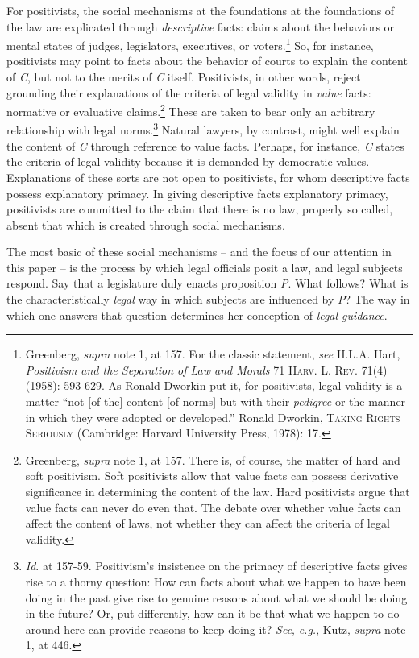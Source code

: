 For positivists, the social mechanisms at the foundations at the
foundations of the law are explicated through \emph{descriptive} facts:
claims about the behaviors or mental states of judges, legislators,
executives, or voters.\footnote{Greenberg, \emph{supra} note 1, at 157.
  For the classic statement, \emph{see} H.L.A. Hart, \emph{Positivism
  and the Separation of Law and Morals} 71 \textsc{Harv. L. Rev.}
  71(4)(1958): 593-629. As Ronald Dworkin put it, for positivists, legal
  validity is a matter ``not {[}of the{]} content {[}of norms{]} but
  with their \emph{pedigree} or the manner in which they were adopted or
  developed.'' Ronald Dworkin, \textsc{Taking Rights Seriously}
  (Cambridge: Harvard University Press, 1978): 17.} So, for instance,
positivists may point to facts about the behavior of courts to explain
the content of \emph{C}, but not to the merits of \emph{C} itself.
Positivists, in other words, reject grounding their explanations of the
criteria of legal validity in \emph{value} facts: normative or
evaluative claims.\footnote{Greenberg, \emph{supra} note 1, at 157.
  There is, of course, the matter of hard and soft positivism. Soft
  positivists allow that value facts can possess derivative significance
  in determining the content of the law. Hard positivists argue that
  value facts can never do even that. The debate over whether value
  facts can affect the content of laws, not whether they can affect the
  criteria of legal validity.} These are taken to bear only an arbitrary
relationship with legal norms.\footnote{\emph{Id}. at 157-59.
  Positivism's insistence on the primacy of descriptive facts gives rise
  to a thorny question: How can facts about what we happen to have been
  doing in the past give rise to genuine reasons about what we should be
  doing in the future? Or, put differently, how can it be that what we
  happen to do around here can provide reasons to keep doing it?
  \emph{See}, \emph{e.g.}, Kutz, \emph{supra} note 1, at 446.} Natural
lawyers, by contrast, might well explain the content of \emph{C} through
reference to value facts. Perhaps, for instance, \emph{C} states the
criteria of legal validity because it is demanded by democratic values.
Explanations of these sorts are not open to positivists, for whom
descriptive facts possess explanatory primacy. In giving descriptive
facts explanatory primacy, positivists are committed to the claim that
there is no law, properly so called, absent that which is created
through social mechanisms.

The most basic of these social mechanisms -- and the focus of our
attention in this paper -- is the process by which legal officials posit
a law, and legal subjects respond. Say that a legislature duly enacts
proposition \emph{P}. What follows? What is the characteristically
\emph{legal} way in which subjects are influenced by \emph{P}? The way
in which one answers that question determines her conception of
\emph{legal guidance}.

